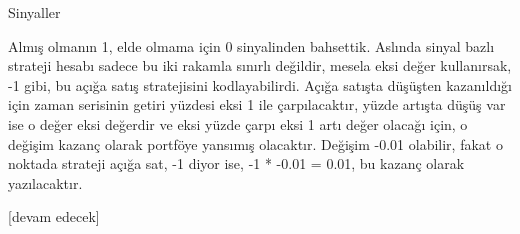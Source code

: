 \documentclass[12pt,fleqn]{article}\usepackage{../../common}
\begin{document}
Sinyaller

Almış olmanın 1, elde olmama için 0 sinyalinden bahsettik. Aslında sinyal bazlı
strateji hesabı sadece bu iki rakamla sınırlı değildir, mesela eksi değer
kullanırsak, -1 gibi, bu açığa satış stratejisini kodlayabilirdi. Açığa satışta
düşüşten kazanıldığı için zaman serisinin getiri yüzdesi eksi 1 ile
çarpılacaktır, yüzde artışta düşüş var ise o değer eksi değerdir ve eksi yüzde
çarpı eksi 1 artı değer olacağı için, o değişim kazanç olarak portföye yansımış
olacaktır. Değişim -0.01 olabilir, fakat o noktada strateji açığa sat, -1 diyor
ise, -1 * -0.01 = 0.01, bu kazanç olarak yazılacaktır.















[devam edecek]
  
\end{document}
